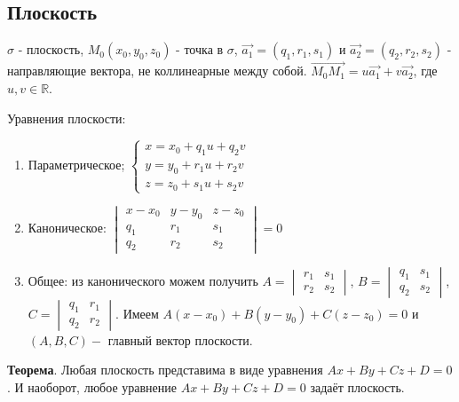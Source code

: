 \documentclass[a4paper]{article}
\begin{document}
\subsection*{Плоскость}

$\sigma$ - плоскость, $M_0(x_0, y_0, z_0)$ - точка в $\sigma$, $\vec{a_1} = (q_1, r_1, s_1)$ и $\vec{a_2} = (q_2, r_2, s_2)$ - направляющие вектора, не коллинеарные между собой.
$\overrightarrow{M_0M_1} = u\vec{a_1} + v\vec{a_2}$, где $u, v \in \mathbb{R}$.


Уравнения плоскости: \begin{enumerate}
\item Параметрическое; $
\begin{cases}
   x = x_0 + q_1u + q_2v 
   \\
   y = y_0 + r_1u + r_2v
   \\
   z = z_0 + s_1u + s_2v  
 \end{cases}
$
\item Каноническое: $\begin{vmatrix}
	x-x_0& y-y_0& z-z_0\\
	q_1& r_1& s_1\\
	q_2& r_2& s_2
\end{vmatrix} = 0$

\item Общее: из канонического можем получить $A = \begin{vmatrix}
	r_1& s_1\\
	r_2&s_2
\end{vmatrix}$, $B = \begin{vmatrix}
	q_1& s_1\\
	q_2&s_2
\end{vmatrix}$, $C = \begin{vmatrix}
	q_1& r_1\\
	q_2&r_2
\end{vmatrix}$. Имеем $A(x-x_0)+B(y-y_0)+C(z-z_0) = 0$ и $(A,B,C) -$  главный	 вектор плоскости.
\end{enumerate}

\begin{htheorem}
\textbf{Теорема}. Любая плоскость представима в виде уравнения $Ax+By+Cz+D=0$. И наоборот, любое уравнение $Ax+By+Cz+D=0$ задаёт плоскость.
\end{htheorem}
\end{document}

